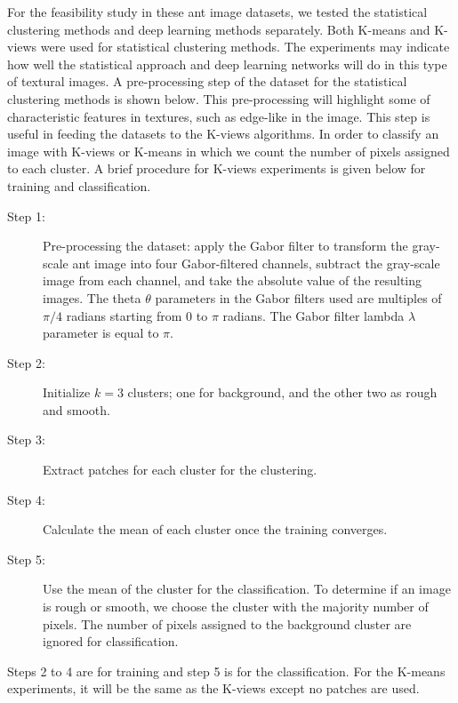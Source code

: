\documentclass{aci}
\numberwithin{equation}{section}
\begin{document}
For the feasibility study in these ant image datasets, we tested the statistical
clustering methods and deep learning methods separately. Both K-means and
K-views were used for statistical clustering methods. The experiments may
indicate how well the statistical approach and deep learning networks will do in
this type of textural images. A pre-processing step of the dataset for the
statistical clustering methods is shown below. This pre-processing will
highlight some of characteristic features in textures, such as edge-like in the
image. This step is useful in feeding the datasets to the K-views algorithms. In
order to classify an image with K-views or K-means in which we count the number
of pixels assigned to each cluster. A brief procedure for K-views experiments is
given below for training and classification.
\begin{description}
    \item[Step 1:] Pre-processing the dataset: apply the Gabor filter to
          transform the gray-scale ant image into four Gabor-filtered channels,
          subtract the gray-scale image from each channel, and take the absolute
          value of the resulting images. The theta $\theta$ parameters in the
          Gabor filters used are multiples of $\pi/4$ radians starting from 0 to
          $\pi$ radians. The Gabor filter lambda $\lambda$ parameter is equal to
          $\pi$.

    \item[Step 2:] Initialize $k = 3$ clusters; one for background, and the
          other two as rough and smooth.

    \item[Step 3:] Extract patches for each cluster for the clustering.

    \item[Step 4:] Calculate the mean of each cluster once the training
          converges.

    \item[Step 5:] Use the mean of the cluster for the classification. To
          determine if an image is rough or smooth, we choose the cluster with
          the majority number of pixels. The number of pixels assigned to the
          background cluster are ignored for classification.
\end{description}

\noindent Steps 2 to 4 are for training and step 5 is for the classification.
For the K-means experiments, it will be the same as the K-views except no
patches are used.
\newline
\end{document}
